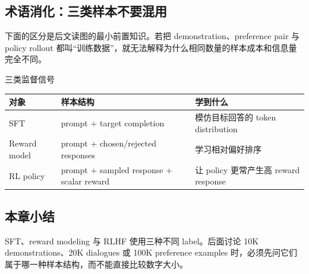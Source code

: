 
\subsection{术语消化：三类样本不要混用}

下面的区分是后文读图的最小前置知识。若把 demonstration、preference pair 与 policy rollout 都叫“训练数据”，就无法解释为什么相同数量的样本成本和信息量完全不同。

\begin{knowledgebox}{三类监督信号}
\begin{tabularx}{\textwidth}{@{}L{0.18\textwidth}L{0.25\textwidth}X@{}}
\toprule
对象 & 样本结构 & 学到什么 \\
\midrule
SFT & prompt + target completion & 模仿目标回答的 token distribution \\
Reward model & prompt + chosen/rejected responses & 学习相对偏好排序 \\
RL policy & prompt + sampled response + scalar reward & 让 policy 更常产生高 reward response \\
\bottomrule
\end{tabularx}
\end{knowledgebox}

\subsection{本章小结}

SFT、reward modeling 与 RLHF 使用三种不同 label。后面讨论 10K demonstrations、20K dialogues 或 100K preference examples 时，必须先问它们属于哪一种样本结构，而不能直接比较数字大小。

